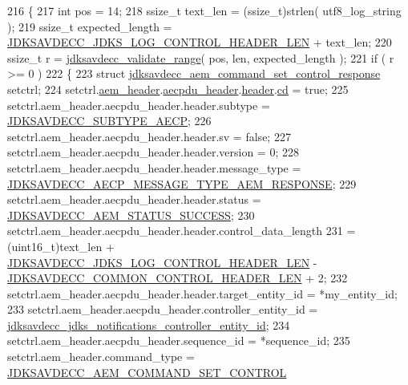 \begin{DoxyCode}
216 \{
217     \textcolor{keywordtype}{int} pos = 14;
218     ssize\_t text\_len = (ssize\_t)strlen( utf8\_log\_string );
219     ssize\_t expected\_length = \hyperlink{group__jdks__log_gaade756dffaac6e4f6d3d3b16e4cea38b}{JDKSAVDECC\_JDKS\_LOG\_CONTROL\_HEADER\_LEN} 
      + text\_len;
220     ssize\_t r = \hyperlink{group__util_ga9c02bdfe76c69163647c3196db7a73a1}{jdksavdecc\_validate\_range}( pos, len, expected\_length );
221     \textcolor{keywordflow}{if} ( r >= 0 )
222     \{
223         \textcolor{keyword}{struct }\hyperlink{structjdksavdecc__aem__command__set__control__response}{jdksavdecc\_aem\_command\_set\_control\_response} 
      setctrl;
224         setctrl.\hyperlink{structjdksavdecc__aem__command__set__control__response_ae1e77ccb75ff5021ad923221eab38294}{aem\_header}.\hyperlink{structjdksavdecc__aecpdu__aem_ae8460ae179666e7ce268ed1ef33d0de3}{aecpdu\_header}.\hyperlink{structjdksavdecc__aecpdu__common_a314cacb6a61bcf18749030c0b6fb7510}{header}.\hyperlink{structjdksavdecc__aecpdu__common__control__header_a8bdacfca3faaf5f7d020bbe533855525}{cd} = \textcolor{keyword}{true};
225         setctrl.aem\_header.aecpdu\_header.header.subtype = 
      \hyperlink{group__subtype_ga4f1d76227a738f442d15ebaf2253b6b3}{JDKSAVDECC\_SUBTYPE\_AECP};
226         setctrl.aem\_header.aecpdu\_header.header.sv = \textcolor{keyword}{false};
227         setctrl.aem\_header.aecpdu\_header.header.version = 0;
228         setctrl.aem\_header.aecpdu\_header.header.message\_type = 
      \hyperlink{group__aecp__message__type_ga9cad401e0f60634a8f084d93b0374d31}{JDKSAVDECC\_AECP\_MESSAGE\_TYPE\_AEM\_RESPONSE};
229         setctrl.aem\_header.aecpdu\_header.header.status = 
      \hyperlink{group__aecpdu__aem__status_gaa4d43ea279e119485de1282522a7fb67}{JDKSAVDECC\_AEM\_STATUS\_SUCCESS};
230         setctrl.aem\_header.aecpdu\_header.header.control\_data\_length
231             = (uint16\_t)text\_len + \hyperlink{group__jdks__log_gaade756dffaac6e4f6d3d3b16e4cea38b}{JDKSAVDECC\_JDKS\_LOG\_CONTROL\_HEADER\_LEN}
       - \hyperlink{group__jdksavdecc__avtp__common__control__header_gaae84052886fb1bb42f3bc5f85b741dff}{JDKSAVDECC\_COMMON\_CONTROL\_HEADER\_LEN} + 2;
232         setctrl.aem\_header.aecpdu\_header.header.target\_entity\_id = *my\_entity\_id;
233         setctrl.aem\_header.aecpdu\_header.controller\_entity\_id = 
      \hyperlink{group__jdks__log_gaa8a55f45c47024872aea1d756c51cd7d}{jdksavdecc\_jdks\_notifications\_controller\_entity\_id};
234         setctrl.aem\_header.aecpdu\_header.sequence\_id = *sequence\_id;
235         setctrl.aem\_header.command\_type = \hyperlink{group__command_ga78648020206806d2992e010573f0ef27}{JDKSAVDECC\_AEM\_COMMAND\_SET\_CONTROL}

\end{DoxyCode}
